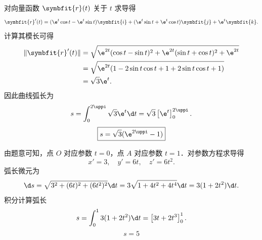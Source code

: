 \begin{solution}

    对向量函数 $\symbfit{r}(t)$ 关于 $t$ 求导得
    \begin{equation}
        \symbfit{r}'(t) = (\e^t \cos t - \e^t \sin t) \symbfit{i} + (\e^t \sin t + \e^t \cos t) \symbfit{j} + \e^t \symbfit{k}.
    \end{equation}
    计算其模长可得
    \begin{equation}
        \begin{aligned}
            \|\symbfit{r}'(t)\| & = \sqrt{\e^{2t}(\cos t - \sin t)^2 + \e^{2t}(\sin t + \cos t)^2 + \e^{2t}} \\
                                & = \sqrt{\e^{2t}(1 - 2\sin t \cos t + 1 + 2\sin t \cos t + 1)}              \\
                                & = \sqrt{3}\e^t.
        \end{aligned}
    \end{equation}
    因此曲线弧长为
    \begin{equation}
        s = \int_{0}^{2\uppi} \sqrt{3}\e^t \d t = \sqrt{3} \left[ \e^t \right]_0^{2\uppi}.
    \end{equation}
    \begin{equation}
        \boxed{s = \sqrt{3}(\e^{2\uppi} - 1)}
    \end{equation}


    由题意可知，点 $O$ 对应参数 $t=0$，点 $A$ 对应参数 $t=1$．对参数方程求导得
    \begin{equation}
        x' = 3, \quad y' = 6t, \quad z' = 6t^2.
    \end{equation}
    弧长微元为
    \begin{equation}
        \d s = \sqrt{3^2 + (6t)^2 + (6t^2)^2} \d t = 3\sqrt{1 + 4t^2 + 4t^4} \d t = 3(1 + 2t^2) \d t.
    \end{equation}
    积分计算弧长
    \begin{equation}
        s = \int_{0}^{1} 3(1 + 2t^2) \d t = \left[ 3t + 2t^3 \right]_0^1.
    \end{equation}
    \begin{equation}
        \boxed{s = 5}
    \end{equation}



\end{solution}
